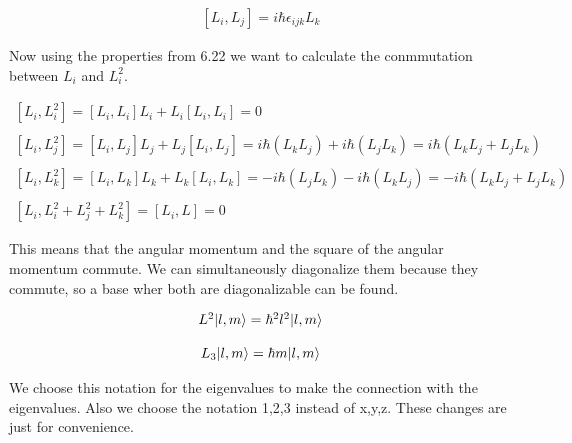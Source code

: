 
\begin{equation}
  \begin{array}{c}
    \label{9.6}
    [L_i,L_j] = i\hbar \epsilon_{ijk} L_k
  \end{array}
\end{equation}

Now using the properties from 6.22 we want to calculate the conmmutation between $L_i$ and $L_i^2$.

\begin{equation}
  \begin{array}{c}
    [L_i,L_i^2] = [L_i,L_i]L_i + L_i[L_i,L_i] = 0
    \\

    \\
    \left[ L_i,L_j^2 \right] = \left[L_i,L_j\right]L_j + L_j[L_i,L_j] = i \hbar \left(L_k L_j \right) + i \hbar \left( L_j L_k \right) = i \hbar (L_k L_j + L_j L_k)
    \\

    \\
    \left[L_i,L_k^2\right] = [L_i,L_k]L_k + L_k[L_i,L_k] = -i\hbar\left(L_j L_k\right)-i\hbar\left(L_k L_j\right) = -i\hbar(L_k L_j + L_j L_k)
    \\

    \\
    \left[L_i,L_i^2 +L_j^2+L_k^2\right] = [L_i, L] = 0
  \end{array}
\end{equation}

This means that the angular momentum and the square of the angular momentum commute. We can simultaneously diagonalize them because they commute, so a base wher both are diagonalizable can be found.

\begin{equation}
  \label{9.8}
  \begin{array}{c}
    L^2 \lvert l,m\rangle = \hbar^2 l^2 \lvert l,m\rangle
    \\

    \\
    L_3 \lvert l,m\rangle = \hbar m \lvert l,m\rangle
  \end{array}
\end{equation}

We choose this notation for the eigenvalues to make the connection with the eigenvalues. Also we choose the notation 1,2,3 instead of x,y,z. These changes are just for convenience.

